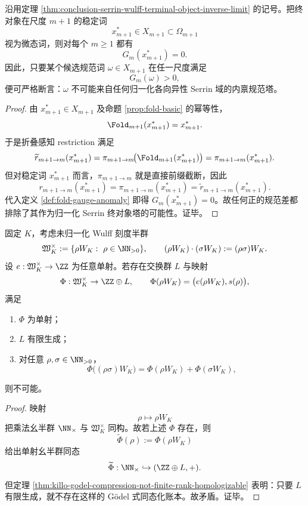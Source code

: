\begin{corollary}\label{cor:conclusion-serrin-wulff-positive-gauge-anomaly-excludes}
沿用定理 \ref{thm:conclusion-serrin-wulff-terminal-object-inverse-limit} 的记号。把终对象在尺度 \(m+1\) 的稳定词
\[
x_{m+1}^\ast\in X_{m+1}\subset\Omega_{m+1}
\]
视为微态词，则对每个 \(m\ge 1\) 都有
\[
G_m(x_{m+1}^\ast)=0.
\]
因此，只要某个候选规范词 \(\omega\in X_{m+1}\) 在任一尺度满足
\[
G_m(\omega)>0,
\]
便可严格断言：\(\omega\) 不可能来自任何归一化各向异性 Serrin 域的内禀规范塔。
\end{corollary}
\begin{proof}
由 \(x_{m+1}^\ast\in X_{m+1}\) 及命题 \ref{prop:fold-basic} 的幂等性，
\[
\Fold_{m+1}(x_{m+1}^\ast)=x_{m+1}^\ast.
\]
于是折叠感知 restriction 满足
\[
\widetilde r_{m+1\to m}(x_{m+1}^\ast)
=
\pi_{m+1\to m}\!\bigl(\Fold_{m+1}(x_{m+1}^\ast)\bigr)
=
\pi_{m+1\to m}(x_{m+1}^\ast).
\]
但对稳定词 \(x_{m+1}^\ast\) 而言，\(\pi_{m+1\to m}\) 就是直接前缀截断，因此
\[
r_{m+1\to m}(x_{m+1}^\ast)=\pi_{m+1\to m}(x_{m+1}^\ast)=\widetilde r_{m+1\to m}(x_{m+1}^\ast).
\]
代入定义 \ref{def:fold-gauge-anomaly} 即得 \(G_m(x_{m+1}^\ast)=0\)。故任何正的规范差都排除了其作为归一化 Serrin 终对象塔的可能性。证毕。
\end{proof}



\begin{theorem}\label{thm:conclusion-serrin-wulff-scale-ledger-impossibility}
固定 \(K\)，考虑未归一化 Wulff 刻度半群
\[
\mathfrak W_K^{\times}:=\{\rho W_K:\ \rho\in\NN_{>0}\},
\qquad
(\rho W_K)\cdot(\sigma W_K):=(\rho\sigma)W_K.
\]
设 \(e:\mathfrak W_K^{\times}\to\ZZ\) 为任意单射。若存在交换群 \(L\) 与映射
\[
\Phi:\mathfrak W_K^{\times}\to \ZZ\oplus L,
\qquad
\Phi(\rho W_K)=\bigl(e(\rho W_K),s(\rho)\bigr),
\]
满足
\begin{enumerate}
  \item \(\Phi\) 为单射；
  \item \(L\) 有限生成；
  \item 对任意 \(\rho,\sigma\in\NN_{>0}\)，
  \[
  \Phi\bigl((\rho\sigma)W_K\bigr)=\Phi(\rho W_K)+\Phi(\sigma W_K),
  \]
\end{enumerate}
则不可能。
\end{theorem}
\begin{proof}
映射
\[
\rho\longmapsto \rho W_K
\]
把乘法幺半群 \(\NN_{\times}\) 与 \(\mathfrak W_K^{\times}\) 同构。故若上述 \(\Phi\) 存在，则
\[
\widetilde\Phi(\rho):=\Phi(\rho W_K)
\]
给出单射幺半群同态
\[
\widetilde\Phi:\NN_{\times}\hookrightarrow(\ZZ\oplus L,+).
\]
但定理 \ref{thm:killo-godel-compression-not-finite-rank-homologizable} 表明：只要 \(L\) 有限生成，就不存在这样的 Gödel 式同态化账本。故矛盾。证毕。
\end{proof}

